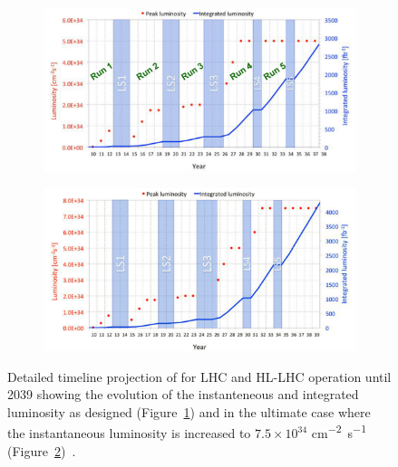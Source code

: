 	\begin{figure}[H]
		\begin{subfigure}{\linewidth}
			\centering
			\includegraphics[width=\plotwidth]{fig/chapt3/HL-LHC-nominal.png}\\
			\caption{\label{fig:HL-LHC-Timeline:A}}
		\end{subfigure}
		\begin{subfigure}{\linewidth}
			\centering
			\includegraphics[width=\plotwidth]{fig/chapt3/HL-LHC-ultimate.png}
			\caption{\label{fig:HL-LHC-Timeline:B}}
		\end{subfigure}
		\caption{\label{fig:HL-LHC-Timeline} Detailed timeline projection of for LHC and HL-LHC operation until 2039 showing the evolution of the instanteneous and integrated luminosity as designed (Figure~\ref{fig:HL-LHC-Timeline:A}) and in the ultimate case where the instantaneous luminosity is increased to $7.5\times10^{34}$ \si{cm^{-2}s^{-1}} (Figure~\ref{fig:HL-LHC-Timeline:B})~\cite{HLLHC2017,HLLHCPDR}.}
	\end{figure}
		
